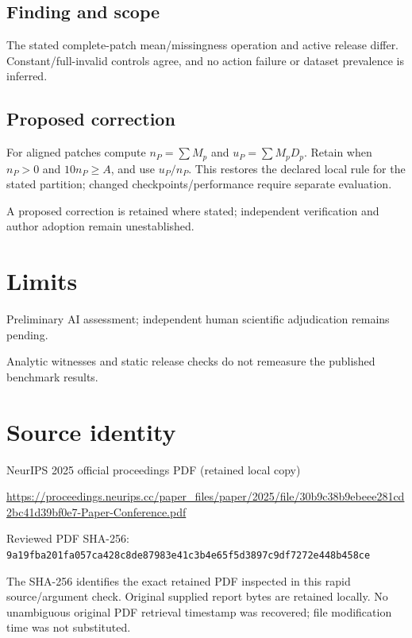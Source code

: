 \documentclass[11pt]{article}
\begin{document}
\subsection*{Finding and scope}

The stated complete-patch mean/missingness operation and active release differ. Constant/full-invalid controls agree, and no action failure or dataset prevalence is inferred.

\subsection*{Proposed correction}

For aligned patches compute \(n_P=\sum M_p\) and \(u_P=\sum M_pD_p\). Retain when \(n_P>0\) and \(10n_P\ge A\), and use \(u_P/n_P\). This restores the declared local rule for the stated partition; changed checkpoints/performance require separate evaluation.

A proposed correction is retained where stated; independent verification and author adoption remain unestablished.

\section*{Limits}

Preliminary AI assessment; independent human scientific adjudication remains pending.\par

Analytic witnesses and static release checks do not remeasure the published benchmark results.\par

\section*{Source identity}

NeurIPS 2025 official proceedings PDF (retained local copy)

\url{https://proceedings.neurips.cc/paper_files/paper/2025/file/30b9c38b9ebeee281cd2bc41d39bf0e7-Paper-Conference.pdf}

Reviewed PDF SHA-256: \nolinkurl{9a19fba201fa057ca428c8de87983e41c3b4e65f5d3897c9df7272e448b458ce}

The SHA-256 identifies the exact retained PDF inspected in this rapid source/argument check. Original supplied report bytes are retained locally. No unambiguous original PDF retrieval timestamp was recovered; file modification time was not substituted.
\end{document}
